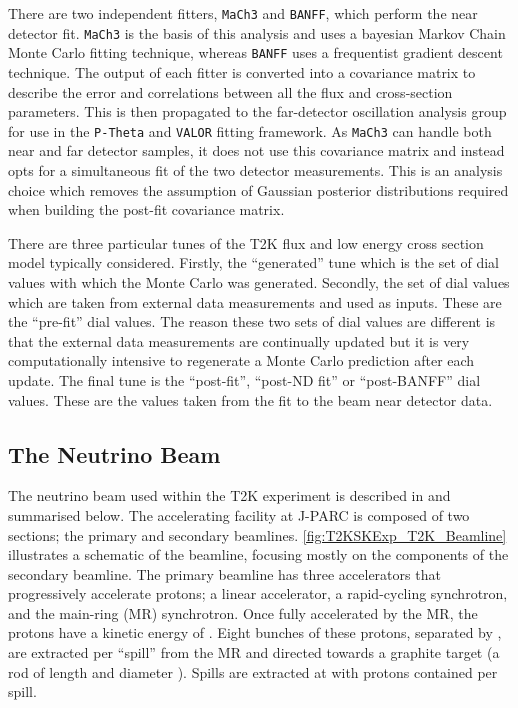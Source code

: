 
There are two independent fitters, \texttt{MaCh3} and \texttt{BANFF}, which perform the near detector fit. \texttt{MaCh3} is the basis of this analysis and uses a bayesian Markov Chain Monte Carlo fitting technique, whereas \texttt{BANFF} uses a frequentist gradient descent technique. The output of each fitter is converted into a covariance matrix to describe the error and correlations between all the flux and cross-section parameters. This is then propagated to the far-detector oscillation analysis group for use in the \texttt{P-Theta} and \texttt{VALOR} fitting framework. As \texttt{MaCh3} can handle both near and far detector samples, it does not use this covariance matrix and instead opts for a simultaneous fit of the two detector measurements. This is an analysis choice which removes the assumption of Gaussian posterior distributions required when building the post-fit covariance matrix.


There are three particular tunes of the T2K flux and low energy cross section model typically considered. Firstly, the ``generated'' tune which is the set of dial values with which the Monte Carlo was generated. Secondly, the set of dial values which are taken from external data measurements and used as inputs. These are the ``pre-fit'' dial values. The reason these two sets of dial values are different is that the external data measurements are continually updated but it is very computationally intensive to regenerate a Monte Carlo prediction after each update. The final tune is the ``post-fit'', ``post-ND fit'' or ``post-BANFF'' dial values. These are the values taken from the fit to the beam near detector data.

\subsection{The Neutrino Beam}
\label{subsec:T2KSKExp_T2K_NeutrinoBeam}

The neutrino beam used within the T2K experiment is described in \cite{t2k_det, Abe_2013} and summarised below. The accelerating facility at J-PARC is composed of two sections; the primary and secondary beamlines. \autoref{fig:T2KSKExp_T2K_Beamline} illustrates a schematic of the beamline, focusing mostly on the components of the secondary beamline. The primary beamline has three accelerators that progressively accelerate protons; a linear accelerator, a rapid-cycling synchrotron, and the main-ring (MR) synchrotron. Once fully accelerated by the MR, the protons have a kinetic energy of . Eight bunches of these protons, separated by , are extracted per ``spill'' from the MR and directed towards a graphite target (a rod of length  and diameter ).
Spills are extracted at  with  protons contained per spill.

